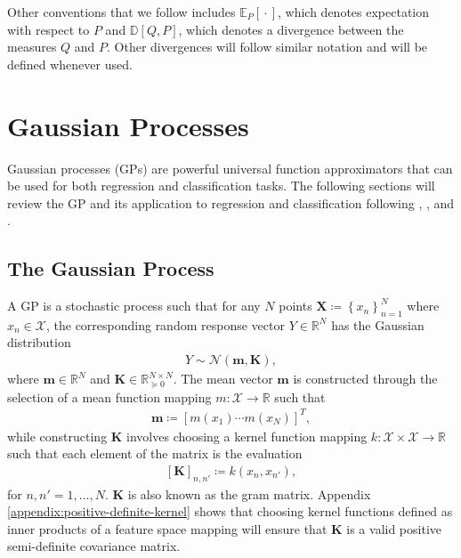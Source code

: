 \documentclass{article}
\newcommand{\wc}{\operatorname{{}\cdot{}}}
\numberwithin{equation}{section}
\begin{document}
Other conventions that we follow includes $\mathbb{E}_{P}[\wc]$, which denotes expectation with respect to $P$ and $\mathbb{D}[Q, P]$, which denotes a divergence between the measures $Q$ and $P$. 
Other divergences will follow similar notation and will be defined whenever used.


\newpage
\section{Gaussian Processes}\label{section:gaussian-processes}
Gaussian processes (GPs) are powerful universal function approximators that can be used for both regression and classification tasks. The following sections will review the GP and its application to regression and classification following \cite{rasmussen2003gaussian}, \cite{matthews2017scalable}, and \cite{wild2022generalized}.

\subsection{The Gaussian Process}\label{section:the-gp}
A GP is a stochastic process such that for any $N$ points $\mathbf{X} \coloneqq \left\{ x_n\right\}_{n=1}^N$ where $x_n \in \mathcal{X}$, the corresponding random response vector $Y \in \mathbb{R}^N$ has the Gaussian distribution
\begin{align}
    \label{gp-vector}
    Y \sim \mathcal{N}\left(\mathbf{m}, \mathbf{K}\right),
\end{align}
where $\mathbf{m} \in \mathbb{R}^N$ and $\mathbf{K} \in  \mathbb{R}^{N \times N}_{\succcurlyeq 0}$.
The mean vector $\mathbf{m}$ is constructed through the selection of a mean function mapping $m: \mathcal{X} \rightarrow \mathbb{R}$ such that
\begin{align}
    \label{gp-mean-vector}
    \mathbf{m} \coloneqq \left[ m(x_1) \cdots m(x_N)\right]^T,
\end{align}
while constructing $\mathbf{K}$ involves choosing a kernel function mapping $k: \mathcal{X} \times \mathcal{X} \rightarrow \mathbb{R}$ such that each element of the matrix is the evaluation
\begin{align}
    \label{gp-kernel-matrix}
    \left[\mathbf{K}\right]_{n, n'} \coloneqq k(x_n, x_{n'}),
\end{align}
for $n, n'=1,\dots, N$.
$\mathbf{K}$ is also known as the gram matrix.
Appendix \ref{appendix:positive-definite-kernel} shows that choosing kernel functions defined as inner products of a feature space mapping will ensure that $\mathbf{K}$ is a valid positive semi-definite covariance matrix.
\end{document}

